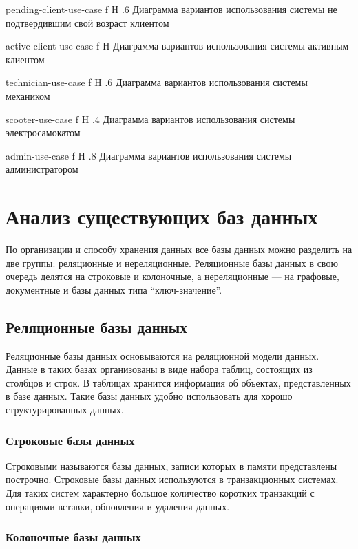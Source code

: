 {pending-client-use-case}
{f}
{H}
{.6\textwidth}
{Диаграмма вариантов использования системы не подтвердившим свой возраст клиентом}

{active-client-use-case}
{f}
{H}
{\textwidth}
{Диаграмма вариантов использования системы активным клиентом}

{technician-use-case}
{f}
{H}
{.6\textwidth}
{Диаграмма вариантов использования системы механиком}

{scooter-use-case}
{f}
{H}
{.4\textwidth}
{Диаграмма вариантов использования системы электросамокатом}

{admin-use-case}
{f}
{H}
{.8\textwidth}
{Диаграмма вариантов использования системы администратором}

\section{Анализ существующих баз данных}

По организации и способу хранения данных все базы данных можно разделить на две группы: реляционные и нереляционные. Реляционные базы данных в свою очередь делятся на строковые и колоночные, а нереляционные --- на графовые, документные и базы данных типа \enquote{ключ-значение}.

\subsection*{Реляционные базы данных}

Реляционные базы данных основываются на реляционной модели данных. Данные в таких базах организованы в виде набора таблиц, состоящих из столбцов и строк. В таблицах хранится информация об объектах, представленных в базе данных. Такие базы данных удобно использовать для хорошо структурированных данных.

\subsubsection{Строковые базы данных}

Строковыми называются базы данных, записи которых в памяти представлены построчно. Строковые базы данных используются в транзакционных системах. Для таких систем характерно большое количество коротких транзакций с операциями вставки, обновления и удаления данных.

\subsubsection{Колоночные базы данных}

